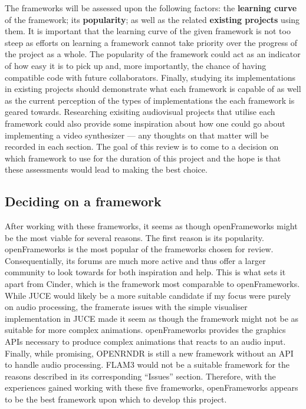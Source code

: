 \documentclass[../main_report2.tex]{subfiles}
\begin{document}
The frameworks will be assessed upon the following factors: the \textbf{learning curve} of the framework; its \textbf{popularity}; as well as the related \textbf{existing projects} using them. It is important that the learning curve of the given framework is not too steep as efforts on learning a framework cannot take priority over the progress of the project as a whole. The popularity of the framework could act as an indicator of how easy it is to pick up and, more importantly, the chance of having compatible code with future collaborators. Finally, studying its implementations in existing projects should demonstrate what each framework is capable of as well as the current perception of the types of implementations the each framework is geared towards. Researching exisiting audiovisual projects that utilise each framework could also provide some inspiration about how one could go about implementing a video synthesizer --- any thoughts on that matter will be recorded in each section. The goal of this review is to come to a decision on which framework to use for the duration of this project and the hope is that these assessments would lead to making the best choice.







\subsection{Deciding on a framework}
After working with these frameworks, it seems as though openFrameworks might be the most viable for several reasons. The first reason is its popularity. openFrameworks is the most popular of the frameworks chosen for review. Consequentially, its forums are much more active and thus offer a larger community to look towards for both inspiration and help. This is what sets it apart from Cinder, which is the framework most comparable to openFrameworks. While JUCE would likely be a more suitable candidate if my focus were purely on audio processing, the framerate issues with the simple visualiser implementation in JUCE made it seem as though the framework might not be as suitable for more complex animations. openFrameworks provides the graphics APIs necessary to produce complex animations that reacts to an audio input. Finally, while promising, OPENRNDR is still a new framework without an API to handle audio processing. FLAM3 would not be a suitable framework for the reasons described in its corresponding ``Issues'' section. Therefore, with the experiences gained working with these five frameworks, openFrameworks appears to be the best framework upon which to develop this project.
\end{document}
